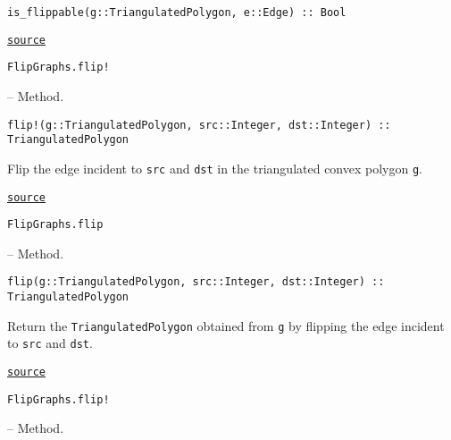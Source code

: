 \begin{adjustwidth}{2em}{0pt}


\begin{verbatim}
is_flippable(g::TriangulatedPolygon, e::Edge) :: Bool
\end{verbatim}



\href{https://github.com/schto223/FlipGraphs.jl/blob/e35d43698a06b86273148826b79d585ba04fcd26/src/polygonTriangulations.jl#L204-L206}{\texttt{source}}


\end{adjustwidth}
\hypertarget{17369255639942436693}{\texttt{FlipGraphs.flip!}}  -- {Method.}

\begin{adjustwidth}{2em}{0pt}


\begin{verbatim}
flip!(g::TriangulatedPolygon, src::Integer, dst::Integer) :: TriangulatedPolygon
\end{verbatim}

Flip the edge incident to \texttt{src} and \texttt{dst} in the triangulated convex polygon \texttt{g}.



\href{https://github.com/schto223/FlipGraphs.jl/blob/e35d43698a06b86273148826b79d585ba04fcd26/src/polygonTriangulations.jl#L162-L166}{\texttt{source}}


\end{adjustwidth}
\hypertarget{863666498151329777}{\texttt{FlipGraphs.flip}}  -- {Method.}

\begin{adjustwidth}{2em}{0pt}


\begin{verbatim}
flip(g::TriangulatedPolygon, src::Integer, dst::Integer) :: TriangulatedPolygon
\end{verbatim}

Return the \texttt{TriangulatedPolygon} obtained from \texttt{g} by flipping the edge incident to \texttt{src} and \texttt{dst}.



\href{https://github.com/schto223/FlipGraphs.jl/blob/e35d43698a06b86273148826b79d585ba04fcd26/src/polygonTriangulations.jl#L141-L145}{\texttt{source}}


\end{adjustwidth}
\hypertarget{3573918791108921628}{\texttt{FlipGraphs.flip!}}  -- {Method.}

